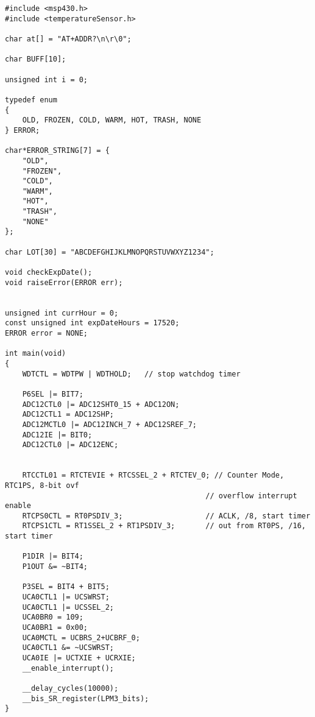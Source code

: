 \begin{code}
\label{code:sub-unit-main-func}
\begin{verbatim}
#include <msp430.h> 
#include <temperatureSensor.h>

char at[] = "AT+ADDR?\n\r\0";

char BUFF[10];

unsigned int i = 0;

typedef enum
{
    OLD, FROZEN, COLD, WARM, HOT, TRASH, NONE
} ERROR;

char*ERROR_STRING[7] = {
    "OLD",
    "FROZEN",
    "COLD",
    "WARM",
    "HOT",
    "TRASH",
    "NONE"
};

char LOT[30] = "ABCDEFGHIJKLMNOPQRSTUVWXYZ1234";

void checkExpDate();
void raiseError(ERROR err);


unsigned int currHour = 0;
const unsigned int expDateHours = 17520;
ERROR error = NONE;

int main(void)
{
    WDTCTL = WDTPW | WDTHOLD;	// stop watchdog timer

    P6SEL |= BIT7;
    ADC12CTL0 |= ADC12SHT0_15 + ADC12ON;
    ADC12CTL1 = ADC12SHP;
    ADC12MCTL0 |= ADC12INCH_7 + ADC12SREF_7;
    ADC12IE |= BIT0;
    ADC12CTL0 |= ADC12ENC;


    RTCCTL01 = RTCTEVIE + RTCSSEL_2 + RTCTEV_0; // Counter Mode, RTC1PS, 8-bit ovf
                                              // overflow interrupt enable
    RTCPS0CTL = RT0PSDIV_3;                   // ACLK, /8, start timer
    RTCPS1CTL = RT1SSEL_2 + RT1PSDIV_3;       // out from RT0PS, /16, start timer

    P1DIR |= BIT4;
    P1OUT &= ~BIT4;

    P3SEL = BIT4 + BIT5;
    UCA0CTL1 |= UCSWRST;
    UCA0CTL1 |= UCSSEL_2;
    UCA0BR0 = 109;
    UCA0BR1 = 0x00;
    UCA0MCTL = UCBRS_2+UCBRF_0;
    UCA0CTL1 &= ~UCSWRST;
    UCA0IE |= UCTXIE + UCRXIE;
    __enable_interrupt();

    __delay_cycles(10000);
    __bis_SR_register(LPM3_bits);
}


\end{verbatim}
\end{code}
